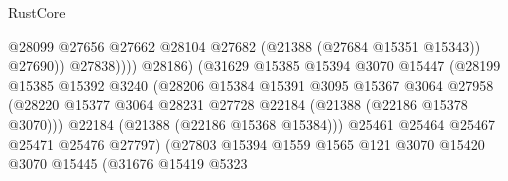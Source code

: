 \begin{lexlean}{RustCore}
\begin{coremodule}
                                                  @28099
                                                  @27656
                                                  @27662
                                                  @28104
                                                  @27682
                                                  (@21388 (@27684 @15351 @15343))
                                                  @27690))
                                              @27838))))
                                      @28186)
                                    (@31629
                                      @15385
                                      @15394
                                      @3070
                                      @15447
                                      (@28199
                                        @15385
                                        @15392
                                        @3240
                                        (@28206
                                          @15384
                                          @15391
                                          @3095
                                          @15367
                                          @3064
                                          @27958
                                          (@28220
                                            @15377
                                            @3064
                                            @28231
                                            @27728
                                            @22184
                                            (@21388 (@22186 @15378 @3070)))
                                          @22184
                                          (@21388 (@22186 @15368 @15384)))
                                        @25461
                                        @25464
                                        @25467
                                        @25471
                                        @25476
                                        @27797)
                                      (@27803
                                        @15394
                                        @1559
                                        @1565
                                        @121
                                        @3070
                                        @15420
                                        @3070
                                        @15445
                                        (@31676
                                          @15419
                                          @5323

\end{coremodule}
\end{lexlean}
